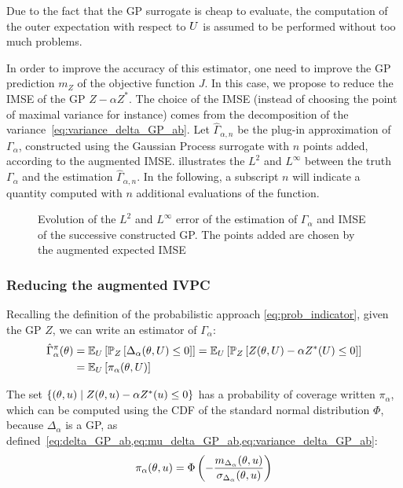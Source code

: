 \documentclass[../../Main_ManuscritThese.tex]{subfiles}
\newcommand\imgpath{/home/victor/acadwriting/Manuscrit/Text/Chapter4/img/}
\begin{document}
  Due to the fact that the GP surrogate is cheap to evaluate, the computation of the outer expectation with respect to $U$ is assumed to be performed without too much problems.

  In order to improve the accuracy of this estimator, one need to improve the GP prediction $m_Z$ of the objective function $J$.
  In this case, we propose to reduce the IMSE of the GP $Z - \alpha Z^*$. The choice of the IMSE (instead of choosing the point of maximal variance for instance) comes from the decomposition of the variance~\cref{eq:variance_delta_GP_ab}.
  Let $\hat{\Gamma}_{\alpha,n}$ be the plug-in approximation of $\Gamma_\alpha$, constructed using the Gaussian Process surrogate with $n$ points added, according to the augmented IMSE.  illustrates the $L^2$ and $L^{\infty}$ between the truth $\Gamma_\alpha$ and the estimation $\hat{\Gamma}_{\alpha,n}$. In the following, a subscript $n$ will indicate a quantity computed with $n$ additional evaluations of the function.

\begin{figure}[ht]
  \centering
  
  \caption{\label{fig:IMSE_enrichment} Evolution of the $L^2$ and $L^\infty$ error of the estimation of $\Gamma_\alpha$ and IMSE of the successive constructed GP. The points added are chosen by the augmented expected IMSE}
\end{figure}

  
\subsubsection{Reducing the augmented IVPC}

Recalling the definition of the probabilistic approach \cref{eq:prob_indicator}, given the GP $Z$, we can write an estimator of $\Gamma_{\alpha}$:
\begin{align}
  \hat{\Gamma}_{\alpha}^{\pi}(\theta) &= \mathbb{E}_U\left[ \mathbb{P}_{Z}\left[ \Delta_{\alpha}(\theta,U) \leq 0\right]\right] = \mathbb{E}_U\left[ \mathbb{P}_{Z}\left[ Z(\theta, U) - \alpha Z^*(U) \leq 0\right]\right] \\
                                   &= \mathbb{E}_U\left[\pi_{\alpha}(\theta,U)\right]
\end{align}

  
The set $\{(\theta, u) \mid Z(\theta, u) - \alpha Z^*(u)\leq 0\}$ has a probability of coverage written $\pi_{\alpha}$, which can be computed using the CDF of the standard normal distribution $\Phi$, because $\Delta_{\alpha}$ is a GP, as defined~\cref{eq:delta_GP_ab,eq:mu_delta_GP_ab,eq:variance_delta_GP_ab}:
\begin{equation}
  \label{eq:def_pialphaku}
  \pi_{\alpha}(\theta,u) = \Phi\left(-\frac{m_{\Delta_\alpha}(\theta,u)}{\sigma_{\Delta_\alpha}(\theta,u)}\right)
\end{equation}
\end{document}
